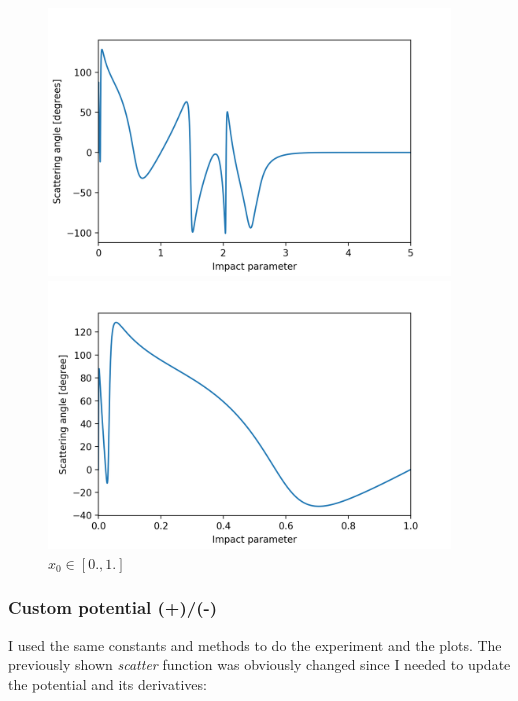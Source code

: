 \documentclass[a4paper,12pt]{article}
\begin{document}
\begin{figure}[H]
	\centering
	\begin{minipage}{0.5\textwidth}
		\centering
		\includegraphics[width=0.95\textwidth]{./chaotic-scattering1signed.png}
        \caption{ $x_{0} \in [0., 5.]$ }
	\end{minipage}\hfill
	\begin{minipage}{0.5\textwidth}
		\centering
		\includegraphics[width=0.95\textwidth]{./chaotic-scattering2signed.png}
		\caption{$x_{0} \in [0., 1.]$}
	\end{minipage}
\end{figure}

\subsubsection{Custom potential (+)/(-)}

\par I used the same constants and methods to do the experiment and the plots. The
previously shown \textit{scatter} function was obviously changed since I needed to
update the potential and its derivatives:
\end{document}

